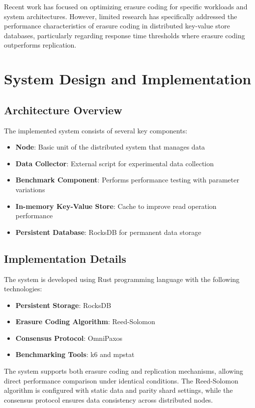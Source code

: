 Recent work has focused on optimizing erasure coding for specific workloads and system architectures. However, limited research has specifically addressed the performance characteristics of erasure coding in distributed key-value store databases, particularly regarding response time thresholds where erasure coding outperforms replication.

\section{System Design and Implementation}

\subsection{Architecture Overview}

The implemented system consists of several key components:
\begin{itemize}
\item \textbf{Node}: Basic unit of the distributed system that manages data
\item \textbf{Data Collector}: External script for experimental data collection
\item \textbf{Benchmark Component}: Performs performance testing with parameter variations
\item \textbf{In-memory Key-Value Store}: Cache to improve read operation performance
\item \textbf{Persistent Database}: RocksDB for permanent data storage
\end{itemize}

\subsection{Implementation Details}

The system is developed using Rust programming language with the following technologies:
\begin{itemize}
\item \textbf{Persistent Storage}: RocksDB
\item \textbf{Erasure Coding Algorithm}: Reed-Solomon
\item \textbf{Consensus Protocol}: OmniPaxos
\item \textbf{Benchmarking Tools}: k6 and mpstat
\end{itemize}

The system supports both erasure coding and replication mechanisms, allowing direct performance comparison under identical conditions. The Reed-Solomon algorithm is configured with static data and parity shard settings, while the consensus protocol ensures data consistency across distributed nodes.

